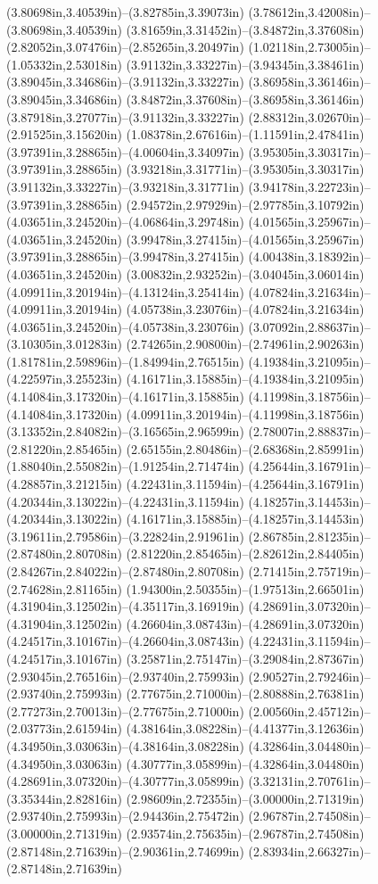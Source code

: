 (3.80698in,3.40539in)--(3.82785in,3.39073in) (3.78612in,3.42008in)--(3.80698in,3.40539in) (3.81659in,3.31452in)--(3.84872in,3.37608in) (2.82052in,3.07476in)--(2.85265in,3.20497in) (1.02118in,2.73005in)--(1.05332in,2.53018in) (3.91132in,3.33227in)--(3.94345in,3.38461in) (3.89045in,3.34686in)--(3.91132in,3.33227in) (3.86958in,3.36146in)--(3.89045in,3.34686in) (3.84872in,3.37608in)--(3.86958in,3.36146in) (3.87918in,3.27077in)--(3.91132in,3.33227in) (2.88312in,3.02670in)--(2.91525in,3.15620in) (1.08378in,2.67616in)--(1.11591in,2.47841in) (3.97391in,3.28865in)--(4.00604in,3.34097in) (3.95305in,3.30317in)--(3.97391in,3.28865in) (3.93218in,3.31771in)--(3.95305in,3.30317in) (3.91132in,3.33227in)--(3.93218in,3.31771in) (3.94178in,3.22723in)--(3.97391in,3.28865in) (2.94572in,2.97929in)--(2.97785in,3.10792in) (4.03651in,3.24520in)--(4.06864in,3.29748in) (4.01565in,3.25967in)--(4.03651in,3.24520in) (3.99478in,3.27415in)--(4.01565in,3.25967in) (3.97391in,3.28865in)--(3.99478in,3.27415in) (4.00438in,3.18392in)--(4.03651in,3.24520in) (3.00832in,2.93252in)--(3.04045in,3.06014in) (4.09911in,3.20194in)--(4.13124in,3.25414in) (4.07824in,3.21634in)--(4.09911in,3.20194in) (4.05738in,3.23076in)--(4.07824in,3.21634in) (4.03651in,3.24520in)--(4.05738in,3.23076in) (3.07092in,2.88637in)--(3.10305in,3.01283in) (2.74265in,2.90800in)--(2.74961in,2.90263in) (1.81781in,2.59896in)--(1.84994in,2.76515in) (4.19384in,3.21095in)--(4.22597in,3.25523in) (4.16171in,3.15885in)--(4.19384in,3.21095in) (4.14084in,3.17320in)--(4.16171in,3.15885in) (4.11998in,3.18756in)--(4.14084in,3.17320in) (4.09911in,3.20194in)--(4.11998in,3.18756in) (3.13352in,2.84082in)--(3.16565in,2.96599in) (2.78007in,2.88837in)--(2.81220in,2.85465in) (2.65155in,2.80486in)--(2.68368in,2.85991in) (1.88040in,2.55082in)--(1.91254in,2.71474in) (4.25644in,3.16791in)--(4.28857in,3.21215in) (4.22431in,3.11594in)--(4.25644in,3.16791in) (4.20344in,3.13022in)--(4.22431in,3.11594in) (4.18257in,3.14453in)--(4.20344in,3.13022in) (4.16171in,3.15885in)--(4.18257in,3.14453in) (3.19611in,2.79586in)--(3.22824in,2.91961in) (2.86785in,2.81235in)--(2.87480in,2.80708in) (2.81220in,2.85465in)--(2.82612in,2.84405in) (2.84267in,2.84022in)--(2.87480in,2.80708in) (2.71415in,2.75719in)--(2.74628in,2.81165in) (1.94300in,2.50355in)--(1.97513in,2.66501in) (4.31904in,3.12502in)--(4.35117in,3.16919in) (4.28691in,3.07320in)--(4.31904in,3.12502in) (4.26604in,3.08743in)--(4.28691in,3.07320in) (4.24517in,3.10167in)--(4.26604in,3.08743in) (4.22431in,3.11594in)--(4.24517in,3.10167in) (3.25871in,2.75147in)--(3.29084in,2.87367in) (2.93045in,2.76516in)--(2.93740in,2.75993in) (2.90527in,2.79246in)--(2.93740in,2.75993in) (2.77675in,2.71000in)--(2.80888in,2.76381in) (2.77273in,2.70013in)--(2.77675in,2.71000in) (2.00560in,2.45712in)--(2.03773in,2.61594in) (4.38164in,3.08228in)--(4.41377in,3.12636in) (4.34950in,3.03063in)--(4.38164in,3.08228in) (4.32864in,3.04480in)--(4.34950in,3.03063in) (4.30777in,3.05899in)--(4.32864in,3.04480in) (4.28691in,3.07320in)--(4.30777in,3.05899in) (3.32131in,2.70761in)--(3.35344in,2.82816in) (2.98609in,2.72355in)--(3.00000in,2.71319in) (2.93740in,2.75993in)--(2.94436in,2.75472in) (2.96787in,2.74508in)--(3.00000in,2.71319in) (2.93574in,2.75635in)--(2.96787in,2.74508in) (2.87148in,2.71639in)--(2.90361in,2.74699in) (2.83934in,2.66327in)--(2.87148in,2.71639in) 